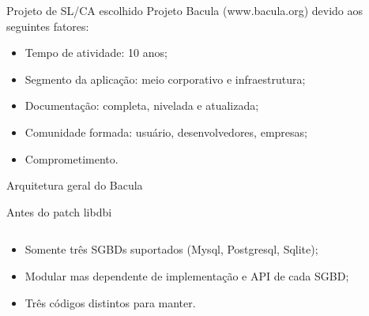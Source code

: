   \begin{frame}{Projeto de SL/CA escolhido}
  Projeto Bacula (www.bacula.org) devido aos seguintes fatores:
    \begin{itemize}
    \item Tempo de atividade: 10 anos;
    \item Segmento da aplicação: meio corporativo e infraestrutura;
    \item Documentação: completa, nivelada e atualizada;
    \item Comunidade formada: usuário, desenvolvedores, empresas;
    \item Comprometimento.
    \end{itemize}
    \begin{center}
    \end{center}
  \end{frame}

  \begin{frame}{Arquitetura geral do Bacula}
    \begin{center}
    \end{center}
  \end{frame}

  \begin{frame}{Antes do patch libdbi}
    \begin{columns}
      \begin{column}{5cm}
        \begin{itemize}
          \item <1> Somente três SGBDs suportados (Mysql, Postgresql, Sqlite);
          \item <2> Modular mas dependente de implementação e API de cada SGBD;
          \item <3> Três códigos distintos para manter.
        \end{itemize}
      \end{column}
      \begin{column}{5cm}
      \end{column}
    \end{columns}
  \end{frame}

